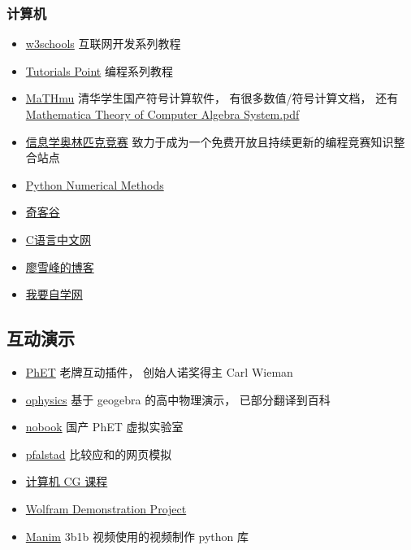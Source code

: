 \subsubsection{计算机}
\begin{itemize}
\item \href{https://www.w3schools.com/}{w3schools} 互联网开发系列教程
\item \href{https://www.tutorialspoint.com/index.htm}{Tutorials Point} 编程系列教程
\item \href{http://mathmu.github.io/MTCAS/RecentChanges.html}{MaTHmu} 清华学生国产符号计算软件， 有很多数值/符号计算文档， 还有 \href{https://github.com/maTHmU/MTCAS}{Mathematica Theory of Computer Algebra System.pdf}
\item \href{https://oi-wiki.org/}{信息学奥林匹克竞赛} 致力于成为一个免费开放且持续更新的编程竞赛知识整合站点
\item \href{https://pythonnumericalmethods.berkeley.edu/notebooks/Index.html}{Python Numerical Methods}
\item \href{https://www.qikegu.com/}{奇客谷}
\item \href{http://c.biancheng.net/}{C语言中文网}
\item \href{https://www.liaoxuefeng.com/}{廖雪峰的博客}
\item \href{https://www.51zxw.net/}{我要自学网}
\end{itemize}

\subsection{互动演示}
\begin{itemize}
\item \href{https://phet.colorado.edu/}{PhET} 老牌互动插件， 创始人诺奖得主 Carl Wieman
\item \href{https://ophysics.com/}{ophysics} 基于 geogebra 的高中物理演示， 已部分翻译到百科
\item \href{https://www.nobook.com/}{nobook} 国产 PhET 虚拟实验室
\item \href{https://www.falstad.com/}{pfalstad} 比较应和的网页模拟
\item \href{http://www.cs.cornell.edu/courses/cs5643/2010sp/}{计算机 CG 课程}
\item \href{https://demonstrations.wolfram.com/topics.php?PhysicalSciences#5}{Wolfram Demonstration Project}
\item \href{https://github.com/3b1b/manim}{Manim} 3b1b 视频使用的视频制作 python 库
\end{itemize}

